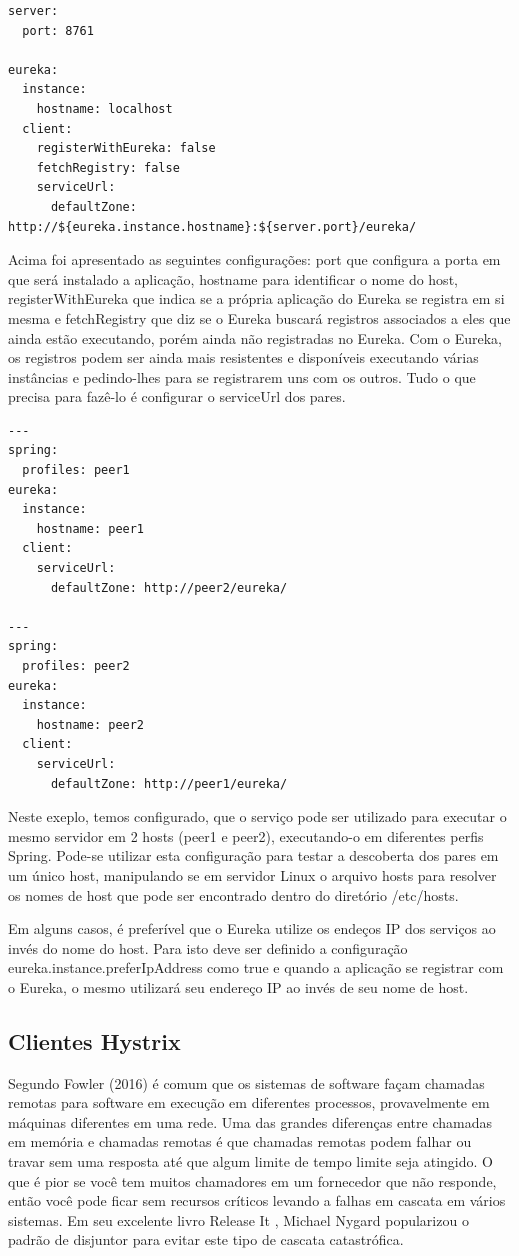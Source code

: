 \begin{verbatim}
server:
  port: 8761

eureka:
  instance:
    hostname: localhost
  client:
    registerWithEureka: false
    fetchRegistry: false
    serviceUrl:
      defaultZone: http://${eureka.instance.hostname}:${server.port}/eureka/
\end{verbatim}

Acima foi apresentado as seguintes configurações: port que configura a porta em que será instalado a aplicação, hostname para identificar o nome do host, registerWithEureka que indica se a própria aplicação do Eureka se registra em si mesma e fetchRegistry que diz se o Eureka buscará registros associados a eles que ainda estão executando, porém ainda não registradas no Eureka.
Com o Eureka, os registros podem ser ainda mais resistentes e disponíveis executando várias instâncias e pedindo-lhes para se registrarem uns com os outros. Tudo o que precisa para fazê-lo é configurar o serviceUrl dos pares.

\begin{verbatim}
---
spring:
  profiles: peer1
eureka:
  instance:
    hostname: peer1
  client:
    serviceUrl:
      defaultZone: http://peer2/eureka/

---
spring:
  profiles: peer2
eureka:
  instance:
    hostname: peer2
  client:
    serviceUrl:
      defaultZone: http://peer1/eureka/
\end{verbatim}

Neste exeplo, temos configurado, que o serviço pode ser utilizado para executar o mesmo servidor em 2 hosts (peer1 e peer2), executando-o em diferentes perfis Spring. Pode-se utilizar esta configuração para testar a descoberta dos pares em um único host, manipulando se em servidor Linux o arquivo hosts para resolver os nomes de host que pode ser encontrado dentro do diretório /etc/hosts.

Em alguns casos, é preferível que o Eureka utilize os endeços IP dos serviços ao invés do nome do host. Para isto deve ser definido a configuração eureka.instance.preferIpAddress como true e quando a aplicação se registrar com o Eureka, o mesmo utilizará seu endereço IP ao invés de seu nome de host.

\subsection{Clientes Hystrix}

Segundo Fowler (2016) é comum que os sistemas de software façam chamadas remotas para software em execução em diferentes processos, provavelmente em máquinas diferentes em uma rede. Uma das grandes diferenças entre chamadas em memória e chamadas remotas é que chamadas remotas podem falhar ou travar sem uma resposta até que algum limite de tempo limite seja atingido. O que é pior se você tem muitos chamadores em um fornecedor que não responde, então você pode ficar sem recursos críticos levando a falhas em cascata em vários sistemas. Em seu excelente livro Release It  , Michael Nygard popularizou o padrão de disjuntor para evitar este tipo de cascata catastrófica.

